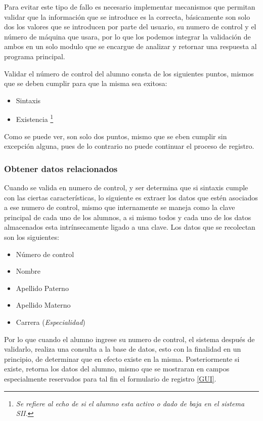 \documentclass[12pt]{article} %
\begin{document}
			Para evitar este tipo de fallo es necesario implementar mecanismos que permitan validar que la información que se introduce es la correcta, básicamente son solo
			dos los valores que se introducen por parte del usuario, su numero de control y el n\'umero de m\'aquina que usara, por lo que los podemos integrar la validación
			de ambos en un solo modulo que se encargue de analizar y retornar una respuesta al programa principal.
			
			Validar el n\'umero de control del alumno consta de los siguientes puntos, mismos que se deben cumplir para que la misma sea exitosa:
			\begin{itemize}
				\item Sintaxis
				\item Existencia \footnote{\scriptsize \textit{Se refiere al echo de si el alumno esta activo o dado de baja en el sistema \gls{SII}.}}
			\end{itemize}
			Como se puede ver, son solo dos puntos, mismo que se eben cumplir sin excepción alguna, pues de lo contrario no puede continuar el proceso de registro.
		\subsubsection{Obtener datos relacionados \label{relacionados}}
			Cuando se valida en numero de control, y ser determina que si sintaxis cumple con las ciertas características, lo siguiente es extraer los datos que estén 
			asociados a ese numero de control, mismo que internamente se maneja como la clave principal de cada uno de los alumnos, a si mismo todos y cada uno de los datos
			almacenados esta intrínsecamente ligado a una clave.
			Los datos que se recolectan son los siguientes:
			\begin{itemize}
				\item N\'umero de control
				\item Nombre
				\item Apellido Paterno
				\item Apellido Materno
				\item Carrera (\textit{Especialidad})
			\end{itemize}
			
			Por lo que cuando el alumno ingrese su numero de control, el sistema después de validarlo, realiza una consulta a la base de datos, esto con la finalidad en un
			principio, de determinar que en efecto existe en la misma.
			Posteriormente si existe, retorna los datos del alumno, mismo que se mostraran en campos especialmente reservados para tal fin el formulario de registro \ref{GUI}.
			
\end{document}
